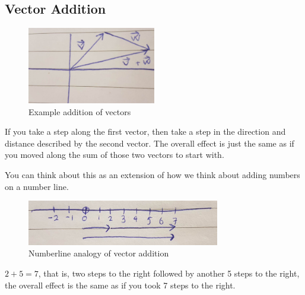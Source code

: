\documentclass{article}
\begin{document}
\begin{center}
    \section{Vector Addition}
\end{center}

\begin{figure}[ht]
    \centering
    \includegraphics[width=0.5\textwidth, height=0.35\textwidth]{la_4.png}
    \caption{Example addition of vectors}
    \label{fig4}
\end{figure}

If you take a step along the first vector, then take a step in the direction and distance described by the second vector. The overall effect is just the same as if you moved along the sum of those two vectors to start with.

You can think about this as an extension of how we think about adding numbers on a number line.

\begin{figure}[H]
    \centering
    \includegraphics[width=0.75\textwidth, height=0.35\textwidth]{la_5.png}
    \caption{Numberline analogy of vector addition}
    \label{fig5}
\end{figure}

$2 + 5 = 7$, that is, two steps to the right followed by another 5 steps to the right, the overall effect is the same as if you took 7 steps to the right.
\end{document}
